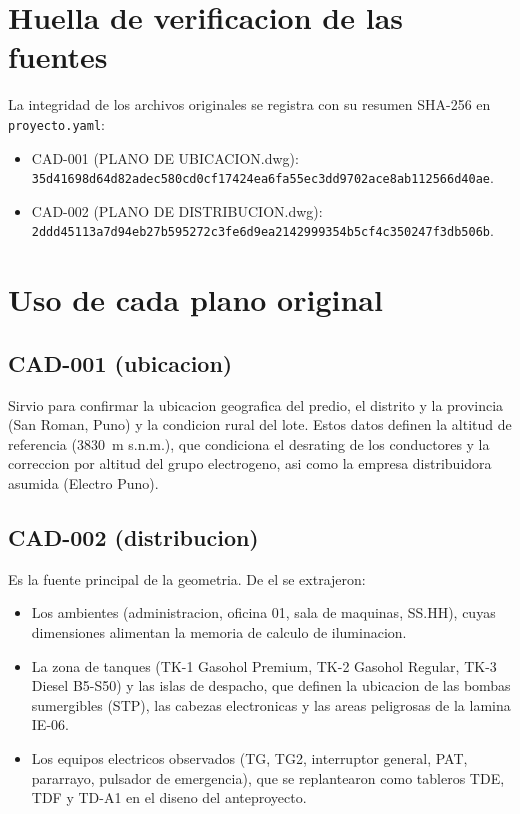 \section{Huella de verificacion de las fuentes}
La integridad de los archivos originales se registra con su resumen SHA-256 en
\texttt{proyecto.yaml}:
\begin{itemize}
\item CAD-001 (PLANO DE UBICACION.dwg): \texttt{35d41698d6\-4d82adec580\-cd0cf17424ea\-6fa55ec3dd9702\-ace8ab112566d40ae}.
\item CAD-002 (PLANO DE DISTRIBUCION.dwg): \texttt{2ddd45113a7d94\-eb27b595272c3f\-e6d9ea2142999354\-b5cf4c350247f3db506b}.
\end{itemize}

\section{Uso de cada plano original}
\subsection{CAD-001 (ubicacion)}
Sirvio para confirmar la ubicacion geografica del predio, el distrito y la
provincia (San Roman, Puno) y la condicion rural del lote. Estos datos definen
la altitud de referencia (3830~m s.n.m.), que condiciona el desrating de los
conductores y la correccion por altitud del grupo electrogeno, asi como la
empresa distribuidora asumida (Electro Puno).

\subsection{CAD-002 (distribucion)}
Es la fuente principal de la geometria. De el se extrajeron:
\begin{itemize}
\item Los ambientes (administracion, oficina 01, sala de maquinas, SS.HH),
  cuyas dimensiones alimentan la memoria de calculo de iluminacion.
\item La zona de tanques (TK-1 Gasohol Premium, TK-2 Gasohol Regular, TK-3
  Diesel B5-S50) y las islas de despacho, que definen la ubicacion de las
  bombas sumergibles (STP), las cabezas electronicas y las areas peligrosas de
  la lamina IE-06.
\item Los equipos electricos observados (TG, TG2, interruptor general, PAT,
  pararrayo, pulsador de emergencia), que se replantearon como tableros TDE,
  TDF y TD-A1 en el diseno del anteproyecto.
\end{itemize}

